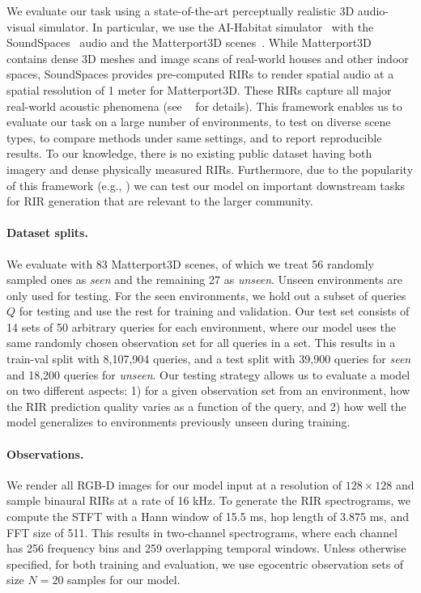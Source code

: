 We evaluate our task using a state-of-the-art perceptually realistic 3D audio-visual simulator. In particular, we use the AI-Habitat simulator~\citep{habitat19iccv} with the SoundSpaces~\citep{chen2020soundspaces} audio and the Matterport3D scenes~\citep{chang2017matterport3d}. While Matterport3D contains dense 3D meshes and image scans of real-world houses and other indoor spaces, SoundSpaces provides pre-computed RIRs to render spatial audio at a spatial resolution of 1 meter for Matterport3D.  These RIRs capture all major real-world acoustic phenomena (see ~\citep{chen2020soundspaces} for details). This framework enables us to evaluate our task on a large number of environments, to test on diverse scene types, to compare methods under same settings, and to report reproducible results. To our knowledge, there is no existing public dataset having both imagery and dense physically measured RIRs. Furthermore, due to the popularity of this framework (e.g., \citep{gao2020visualechoes,DBLP:journals/corr/abs-2008-09622, NEURIPS2020_ab6b331e, majumder2021move2hear, purushwalkam2021audio, chen2022visual}) we can test our model on important downstream tasks for RIR generation that are relevant to the larger community.

\paragraph{Dataset splits.} We evaluate with 83 Matterport3D scenes, of which we treat 56 randomly sampled ones as \emph{seen} and the remaining 27 as \emph{unseen}. Unseen environments are only used for testing.  For the seen environments, we hold out a subset of queries $Q$ for testing and use the rest for training and validation. Our test set consists of 14 sets of 50 arbitrary queries for each environment, where our model uses the same randomly chosen observation set for all queries in a set. This results in a train-val split with 8,107,904 queries, and a test split with 39,900 queries for \emph{seen} and 18,200 queries for \emph{unseen}. Our testing strategy allows us to evaluate a model on two different aspects: 1) for a given observation set from an environment, how the RIR prediction quality varies as a function of the query, and 2) how well the model generalizes to environments previously unseen during training.  

\paragraph{Observations.}
We render all RGB-D images for our model input at a resolution of $128 \times 128$ and sample binaural RIRs at a rate of 16 kHz. To generate the RIR spectrograms, we compute the STFT with a Hann window of 15.5 ms, hop length of 3.875 ms, and FFT size of 511. This results in two-channel spectrograms, where each channel has 256 frequency bins and 259 overlapping temporal windows. Unless otherwise specified, for both training and evaluation, we use egocentric observation sets of size $N=20$ samples for our model. 

